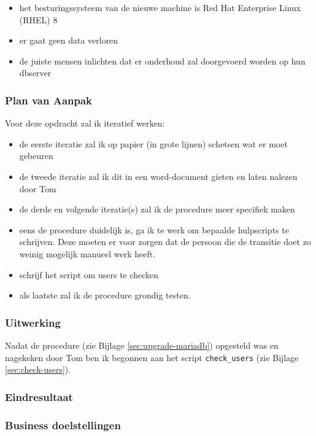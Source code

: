 \begin{itemize}
    \item het besturingssysteem van de nieuwe machine is Red Hat Enterprise Linux (RHEL) 8
    \item er gaat geen data verloren
    \item de juiste mensen inlichten dat er onderhoud zal doorgevoerd worden op hun dbserver
\end{itemize}

\subsubsection{Plan van Aanpak}

Voor deze opdracht zal ik iteratief werken:

\begin{itemize}
    \item de eerste iteratie zal ik op papier (in grote lijnen) schetsen wat er moet gebeuren
    \item de tweede iteratie zal ik dit in een word-document gieten en laten nalezen door Tom
    \item de derde en volgende iteratie(s) zal ik de procedure meer specifiek maken
    \item eens de procedure duidelijk is, ga ik te werk om bepaalde hulpscripts te schrijven. Deze moeten er voor zorgen dat de persoon die de transitie doet zo weinig mogelijk manueel werk heeft.
    \item schrijf het script om users te checken
    \item als laatste zal ik de procedure grondig testen.
\end{itemize}

\subsubsection{Uitwerking}

Nadat de procedure (zie Bijlage \ref{sec:upgrade-mariadb}) opgesteld was en nagekeken door Tom ben ik begonnen aan het script \verb*|check_users| (zie Bijlage \ref{sec:check-users}).

\subsubsection{Eindresultaat}
\subsubsection{Business doelstellingen}
